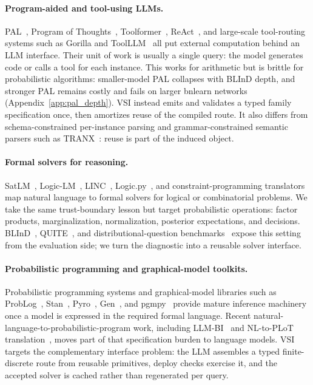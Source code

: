 \documentclass{article}
\newcommand{\method}{VSI}
\begin{document}
\paragraph{Program-aided and tool-using LLMs.}
PAL~\citep{gao2023pal}, Program of Thoughts~\citep{chen2023pot}, Toolformer~\citep{schick2023toolformer}, ReAct~\citep{yao2023react}, and large-scale tool-routing systems such as Gorilla and ToolLLM~\citep{patil2024gorilla,qin2024toolllm} all put external computation behind an LLM interface.
Their unit of work is usually a single query: the model generates code or calls a tool for each instance.
This works for arithmetic but is brittle for probabilistic algorithms: smaller-model PAL collapses with BLInD depth, and stronger PAL remains costly and fails on larger bnlearn networks (Appendix~\ref{app:pal_depth}).
\method{} instead emits and validates a typed family specification once, then amortizes reuse of the compiled route.
It also differs from schema-constrained per-instance parsing and grammar-constrained semantic parsers such as TRANX~\citep{yin2018tranx}: reuse is part of the induced object.

\paragraph{Formal solvers for reasoning.}
SatLM~\citep{ye2023satlm}, Logic-LM~\citep{pan2023logiclm}, LINC~\citep{olausson2023linc}, Logic.py~\citep{kesseli2025logicpy}, and constraint-programming translators~\citep{michailidis2024cp} map natural language to formal solvers for logical or combinatorial problems.
We take the same trust-boundary lesson but target probabilistic operations: factor products, marginalization, normalization, posterior expectations, and decisions.
BLInD~\citep{nafar2025blind}, QUITE~\citep{schrader2024quite}, and distributional-question benchmarks~\citep{paruchuri2024odds} expose this setting from the evaluation side; we turn the diagnostic into a reusable solver interface.

\paragraph{Probabilistic programming and graphical-model toolkits.}
Probabilistic programming systems and graphical-model libraries such as ProbLog~\citep{deraedt2007problog,fierens2015problog2}, Stan~\citep{carpenter2017stan}, Pyro~\citep{bingham2019pyro}, Gen~\citep{cusumanotowner2019gen}, and pgmpy~\citep{ankan2015pgmpy} provide mature inference machinery once a model is expressed in the required formal language.
Recent natural-language-to-probabilistic-program work, including LLM-BI~\citep{huang2025llmbi} and NL-to-PLoT translation~\citep{wong2023word}, moves part of that specification burden to language models.
\method{} targets the complementary interface problem: the LLM assembles a typed finite-discrete route from reusable primitives, deploy checks exercise it, and the accepted solver is cached rather than regenerated per query.
\end{document}
